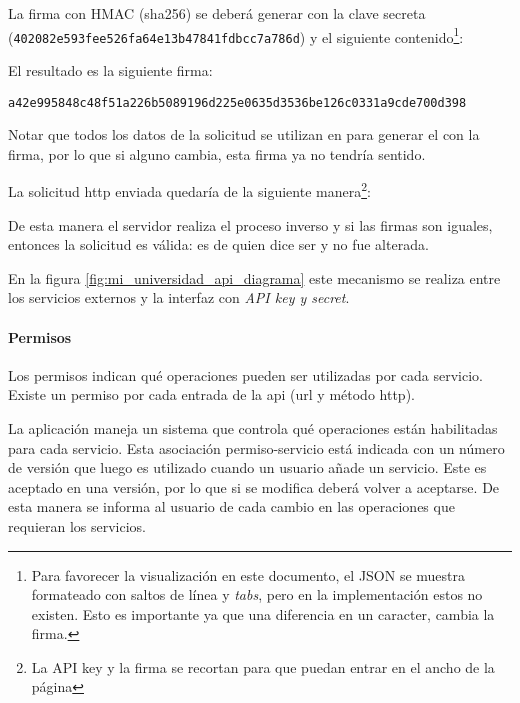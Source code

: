 La firma con HMAC (sha256) se deberá generar con la clave secreta (\lstinline{402082e593fee526fa64e13b47841fdbcc7a786d}) y el siguiente contenido\footnote{Para favorecer la visualización en este documento, el JSON se muestra formateado con saltos de línea y \textit{tabs}, pero en la implementación estos no existen. Esto es importante ya que una diferencia en un caracter, cambia la firma.}:

\begingroup
\endgroup

El resultado es la siguiente firma:

\lstinline{a42e995848c48f51a226b5089196d225e0635d3536be126c0331a9cde700d398}


Notar que todos los datos de la solicitud se utilizan en para generar el  con la firma, por lo que si alguno cambia, esta firma ya no tendría sentido.

La solicitud \gls{http} enviada quedaría de la siguiente manera\footnote{La API key y la firma se recortan para que puedan entrar en el ancho de la página}:
\begingroup
\endgroup

De esta manera el servidor realiza el proceso inverso y si las firmas son iguales, entonces la solicitud es válida: es de quien dice ser y no fue alterada.

En la figura \ref{fig:mi_universidad_api_diagrama} este mecanismo se realiza entre los servicios externos y la interfaz con \textit{API key y secret}.

\paragraph{Permisos}
\label{autenticacion_permisos}

Los permisos indican qué operaciones pueden ser utilizadas por cada servicio. Existe un permiso por cada entrada de la \gls{api} (\gls{url} y método \gls{http}).

La aplicación \nombreApp{} maneja un sistema que controla qué operaciones están habilitadas para cada servicio. Esta asociación permiso-servicio está indicada con un número de versión que luego es utilizado cuando un usuario añade un servicio. Este es aceptado en una versión, por lo que si se modifica deberá volver a aceptarse. De esta manera se informa al usuario de cada cambio en las operaciones que requieran los servicios.

